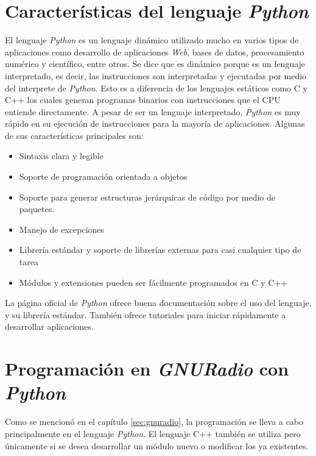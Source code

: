 \section{Caracter\'isticas del lenguaje \emph{Python}}
El lenguaje \emph{Python} es un lenguaje din\'amico utilizado mucho en varios tipos de aplicaciones como desarrollo de
aplicaciones \emph{Web}, bases de datos, procesamiento num\'erico y cient\'ifico, entre otros. Se dice que es din\'amico porque es
un lenguaje interpretado, es decir, las instrucciones son interpretadas y ejecutadas por medio del interprete de \emph{Python}.
Esto es a diferencia de los lenguajes est\'aticos como C y C++ los cuales generan programas binarios con instrucciones que el CPU
entiende directamente. A pesar de ser un lenguaje interpretado, \emph{Python} es muy r\'apido en su ejecuci\'on de instrucciones
para la mayor\'ia de aplicaciones. Algunas de sus caracter\'isticas principales son:

\begin{itemize}
  \item Sintaxis clara y legible
  \item Soporte de programaci\'on orientada a objetos
  \item Soporte para generar estructuras jer\'arquicas de c\'odigo por medio de paquetes.
  \item Manejo de excepciones
  \item Librer\'ia est\'andar y soporte de librer\'ias externas para casi cualquier tipo de tarea
  \item M\'odulos y extensiones pueden ser f\'acilmente programados en C y C++
\end{itemize}

La p\'agina oficial de \emph{Python} ofrece buena documentaci\'on sobre el uso del lenguaje, y su librer\'ia est\'andar. Tambi\'en
ofrece tutoriales para iniciar r\'apidamente a desarrollar aplicaciones.

\section{Programaci\'on en \emph{GNURadio} con \emph{Python}}

Como se mencion\'o en el cap\'itulo \ref{sec:gnuradio}, la programaci\'on se lleva a
cabo principalmente en el lenguaje \emph{Python}. El lenguaje C++ tambi\'en se utiliza
pero \'unicamente si se desea desarrollar un m\'odulo nuevo o modificar los ya existentes.

